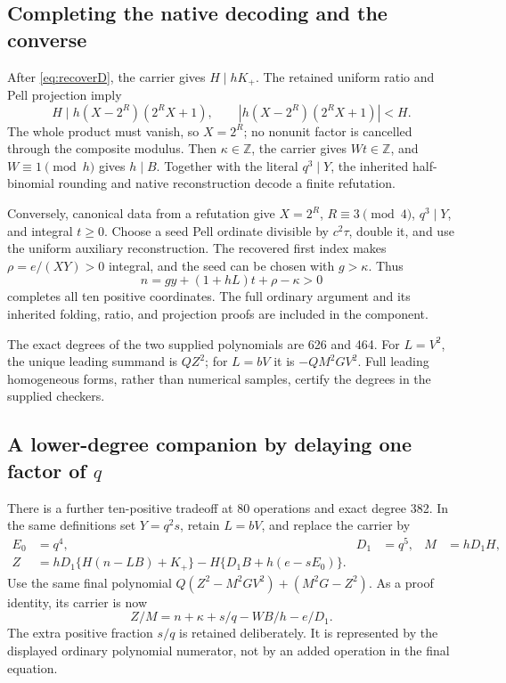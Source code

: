 \documentclass[11pt,letterpaper]{article}
\theoremstyle{remark}\newtheorem{remark}[theorem]{Remark}
\newcommand{\Z}{\mathbb Z}
\newcommand{\file}[1]{\texttt{\small\detokenize{#1}}}
\begin{document}
\subsection{Completing the native decoding and the converse}

After \eqref{eq:recoverD}, the carrier gives $H\mid hK_+$.
The retained uniform ratio and Pell projection imply
\[
H\mid h(X-2^R)(2^RX+1),\qquad
|h(X-2^R)(2^RX+1)|<H.
\]
The whole product must vanish, so $X=2^R$; no nonunit factor is cancelled
through the composite modulus. Then $\kappa\in\Z$, the carrier gives
$Wt\in\Z$, and $W\equiv1\pmod h$ gives $h\mid B$.
Together with the literal $q^3\mid Y$, the inherited half-binomial rounding
and native reconstruction decode a finite refutation.

Conversely, canonical data from a refutation give $X=2^R$, $R\equiv3\pmod4$,
$q^3\mid Y$, and integral $t\ge0$. Choose a seed Pell ordinate divisible by
$c^2\tau$, double it, and use the uniform auxiliary reconstruction.
The recovered first index makes $\rho=e/(XY)>0$ integral, and the seed
can be chosen with $g>\kappa$. Thus
\[
n=gy+(1+hL)t+\rho-\kappa>0
\]
completes all ten positive coordinates. The full ordinary argument and its
inherited folding, ratio, and projection proofs are included in the
\file{compact_xy} component.

The exact degrees of the two supplied polynomials are 626 and 464.
For $L=V^2$, the unique leading summand is $QZ^2$; for $L=bV$ it is
$-QM^2GV^2$. Full leading homogeneous forms, rather than numerical samples,
certify the degrees in the supplied checkers.

\subsection{A lower-degree companion by delaying one factor of \texorpdfstring{$q$}{q}}

There is a further ten-positive tradeoff at 80 operations and exact degree
382. In the same definitions set $Y=q^2s$, retain $L=bV$, and replace the
carrier by
\begin{align*}
E_0&=q^4,& D_1&=q^5,& M&=hD_1H,\\
Z&=hD_1\{H(n-LB)+K_+\}-H\{D_1B+h(e-sE_0)\}.
\end{align*}
Use the same final polynomial $Q(Z^2-M^2GV^2)+(M^2G-Z^2)$.
As a proof identity, its carrier is now
\[
Z/M=n+\kappa+s/q-WB/h-e/D_1.
\]
The extra positive fraction $s/q$ is retained deliberately. It is represented
by the displayed ordinary polynomial numerator, not by an added operation
in the final equation.
\end{document}
